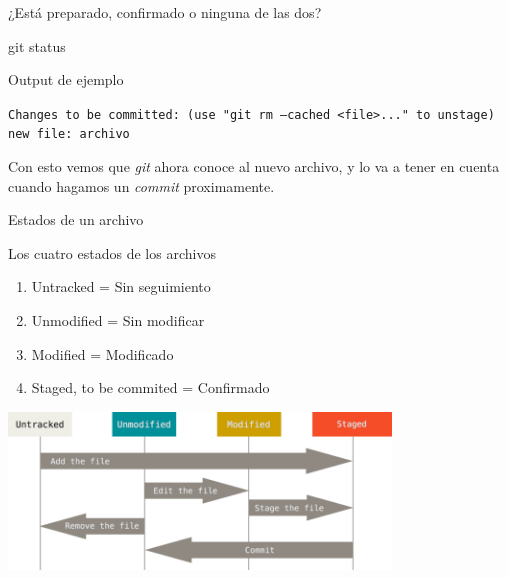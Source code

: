 \begin{frame}[fragile, t]{¿Está preparado, confirmado o ninguna de las dos?}
    \begin{comando}
        git status
    \end{comando}
    \begin{block}{Output de ejemplo}
            \begin{center}
            \texttt{Changes to be committed:
  (use "git rm --cached <file>..." to unstage)
        \\new file:  archivo}
            \end{center}
        \end{block}
   \begin{block}{}
       Con esto vemos que \textit{git} ahora conoce al nuevo archivo, y lo va a tener en cuenta cuando hagamos un \textit{commit} proximamente.
   \end{block}     
\end{frame}

\begin{frame}{Estados de un archivo}

    \begin{block}{Los cuatro estados de los archivos}
            \begin{enumerate}
    \item Untracked = Sin seguimiento
    \item Unmodified = Sin modificar
    \item Modified = Modificado
    \item Staged, to be commited = Confirmado
    \end{enumerate}
    \end{block}
    \begin{center}
        \includegraphics[width=4in]{images/lifecycle.png}
    \end{center}    
\end{frame}


